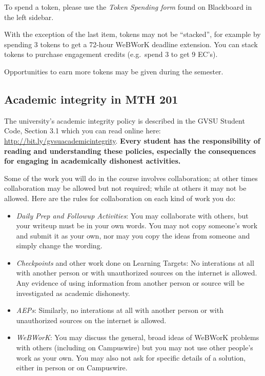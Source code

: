 \documentclass[]{article}
\providecommand{\tightlist}{%
  \setlength{\itemsep}{0pt}\setlength{\parskip}{0pt}}
\begin{document}
To spend a token, please use the \emph{Token Spending form} found on
Blackboard in the left sidebar.

With the exception of the last item, tokens may not be ``stacked'', for
example by spending 3 tokens to get a 72-hour WeBWorK deadline
extension. You can stack tokens to purchase engagement credits
(e.g.~spend 3 to get 9 EC's).

Opportunities to earn more tokens may be given during the semester.

\hypertarget{academic-integrity-in-mth-201}{%
\subsection{Academic integrity in MTH
201}\label{academic-integrity-in-mth-201}}

The university's academic integrity policy is described in the GVSU
Student Code, Section 3.1 which you can read online here:
\url{http://bit.ly/gvsuacademicintegrity}. \textbf{Every student has the
responsibility of reading and understanding these policies, especially
the consequences for engaging in academically dishonest activities.}

Some of the work you will do in the course involves collaboration; at
other times collaboration may be allowed but not required; while at
others it may not be allowed. Here are the rules for collaboration on
each kind of work you do:

\begin{itemize}
\tightlist
\item
  \emph{Daily Prep and Followup Activities}: You may collaborate with
  others, but your writeup must be in your own words. You may not copy
  someone's work and submit it as your own, nor may you copy the ideas
  from someone and simply change the wording.
\item
  \emph{Checkpoints} and other work done on Learning Targets: No
  interations at all with another person or with unauthorized sources on
  the internet is allowed. Any evidence of using information from
  another person or source will be investigated as academic dishonesty.
\item
  \emph{AEPs}: Similarly, no interations at all with another person or
  with unauthorized sources on the internet is allowed.
\item
  \emph{WeBWorK}: You may discuss the general, broad ideas of WeBWorK
  problems with others (including on Campuswire) but you may not use
  other people's work as your own. You may also not ask for specific
  details of a solution, either in person or on Campuswire.
\end{itemize}
\end{document}
